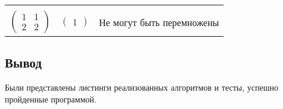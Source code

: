 \begin{table}[h!]
\begin{center}
\begin{threeparttable}
\begin{tabular}{|c|c|c|}
			 &  & \\[-1em]
			$\begin{pmatrix}
				1 & 1\\
				2 & 2
			\end{pmatrix}$ &
			$\begin{pmatrix}
				1
			\end{pmatrix}$ &
			Не могут быть перемножены 
			\tabularnewline[2em]
			\hline
		\end{tabular}
		\end{threeparttable}
	\end{center}
\end{table}

\subsection*{Вывод}

Были представлены листинги реализованных алгоритмов и тесты, успешно пройденные программой.
